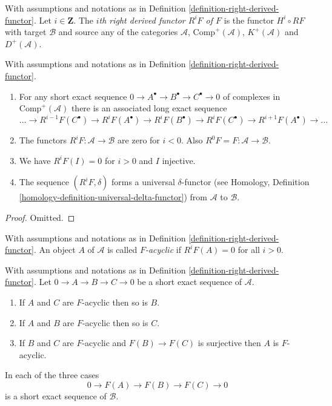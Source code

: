 \begin{definition}
\label{definition-higher-derived-functors}
With assumptions and notations as in
Definition \ref{definition-right-derived-functor}.
Let $i \in \mathbf{Z}$.
The {\it $i$th right derived functor $R^iF$ of $F$} is the functor
$H^i \circ RF$ with target $\mathcal{B}$ and source
any of the categories $\mathcal{A}$, $\text{Comp}^{+}(\mathcal{A})$,
$K^{+}(\mathcal{A})$ and $D^{+}(\mathcal{A})$.
\end{definition}

\begin{lemma}
\label{lemma-higher-derived-functors}
With assumptions and notations as in
Definition \ref{definition-right-derived-functor}.
\begin{enumerate}
\item For any short exact sequence
$0 \to A^\bullet \to B^\bullet \to C^\bullet \to 0$
of complexes in $\text{Comp}^{+}(\mathcal{A})$ there
is an associated long exact sequence
$$
\ldots \to 
R^{i - 1}F(C^\bullet) \to
R^iF(A^\bullet) \to
R^iF(B^\bullet) \to
R^iF(C^\bullet) \to
R^{i + 1}F(A^\bullet) \to \ldots
$$
\item The functors $R^iF : \mathcal{A} \to \mathcal{B}$
are zero for $i < 0$. Also $R^0F = F : \mathcal{A} \to \mathcal{B}$.
\item We have $R^iF(I) = 0$ for $i > 0$ and $I$ injective.
\item The sequence $(R^iF, \delta)$ forms a universal $\delta$-functor (see
Homology, Definition \ref{homology-definition-universal-delta-functor})
from $\mathcal{A}$ to $\mathcal{B}$.
\end{enumerate}
\end{lemma}

\begin{proof}
Omitted.
\end{proof}

\begin{definition}
\label{definition-F-acyclic}
With assumptions and notations as in
Definition \ref{definition-right-derived-functor}.
An object $A$ of $\mathcal{A}$ is called {\it $F$-acyclic}
if $R^iF(A) = 0$ for all $i > 0$.
\end{definition}

\begin{lemma}
\label{lemma-F-acyclic-ses}
With assumptions and notations as in
Definition \ref{definition-right-derived-functor}.
Let $0 \to A \to B \to C \to 0$ be a short exact sequence
of $\mathcal{A}$.
\begin{enumerate}
\item If $A$ and $C$ are $F$-acyclic then so is $B$.
\item If $A$ and $B$ are $F$-acyclic then so is $C$.
\item If $B$ and $C$ are $F$-acyclic and $F(B) \to F(C)$ is surjective
then $A$ is $F$-acyclic.
\end{enumerate}
In each of the three cases
$$
0 \to F(A) \to F(B) \to F(C) \to 0
$$
is a short exact sequence of $\mathcal{B}$.
\end{lemma}

